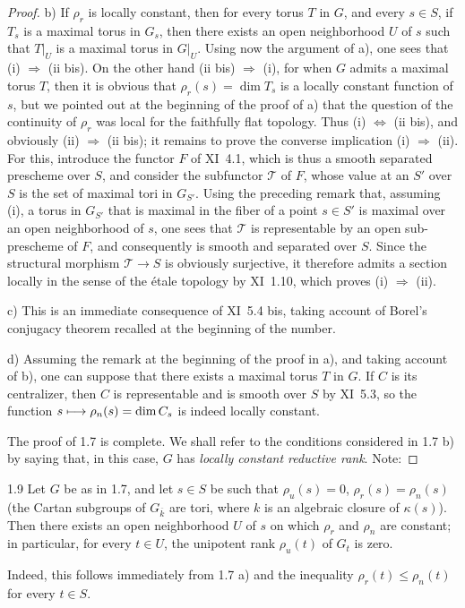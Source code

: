 \begin{proof}
b) If $\rho_r$ is locally constant, then for every torus $T$ in $G$, and every $s\in S$, if $T_s$ is a maximal torus in $G_s$, then there exists an open neighborhood $U$ of $s$ such that $T|_U$ is a maximal torus in $G|_U$. Using now the argument of a), one sees that (i) $\Rightarrow$ (ii bis). On the other hand (ii bis) $\Rightarrow$ (i), for when $G$ admits a maximal torus $T$, then it is obvious that $\rho_r(s)=\dim T_s$ is a locally constant function of $s$, but we pointed out at the beginning of the proof of a) that the question of the continuity of $\rho_r$ was local for the faithfully flat topology. Thus (i) $\Leftrightarrow$ (ii bis), and obviously (ii) $\Rightarrow$ (ii bis); it remains to prove the converse implication (i) $\Rightarrow$ (ii). For this, introduce the functor $F$ of XI~4.1, which is thus a smooth separated prescheme over $S$, and consider the subfunctor $\mathscr T$ of $F$, whose value at an $S'$ over $S$ is the set of maximal tori in $G_{S'}$. Using the preceding remark that, assuming (i), a torus in $G_{S'}$ that is maximal in the fiber of a point $s\in S'$ is maximal over an open neighborhood of $s$, one sees that $\mathscr T$ is representable by an open sub-prescheme of $F$, and consequently is smooth and separated over $S$. Since the structural morphism $\mathscr T\to S$ is obviously surjective, it therefore admits a section locally in the sense of the étale topology by XI~1.10, which proves (i) $\Rightarrow$ (ii).

c) This is an immediate consequence of XI~5.4 bis, taking account of Borel's conjugacy theorem recalled at the beginning of the number.

d) Assuming the remark at the beginning of the proof in a), and taking account of b), one can suppose that there exists a maximal torus $T$ in $G$. If $C$ is its centralizer, then $C$ is representable and is smooth over $S$ by XI~5.3, so the function $s\longmapsto\rho_n(s)=\dim C_s$ is indeed locally constant.

The proof of 1.7 is complete. We shall refer to the conditions considered in 1.7 b) by saying that, in this case, $G$ has \emph{locally constant reductive rank}. Note:
\end{proof}
\begin{corollary}{1.9}\label{XII.1.9}
Let $G$ be as in 1.7, and let $s\in S$ be such that $\rho_u(s)=0$, \ie $\rho_r(s)=\rho_n(s)$ (\ie the Cartan subgroups of $G_{\overline k}$ are tori, where $k$ is an algebraic closure of $\kappa(s)$). Then there exists an open neighborhood $U$ of $s$ on which $\rho_r$ and $\rho_n$ are constant; in particular, for every $t\in U$, the unipotent rank $\rho_u(t)$ of $G_t$ is zero.
\end{corollary}
Indeed, this follows immediately from 1.7 a) and the inequality $\rho_r(t)\le\rho_n(t)$ for every $t\in S$.


